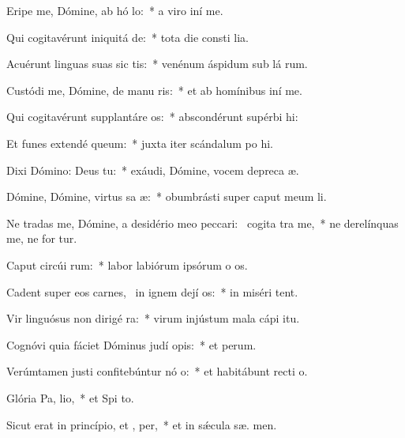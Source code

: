\item Eripe me, Dómine, ab hó lo:~* a viro iní  me.
\item Qui cogitavérunt iniquitá  de:~* tota die consti lia.
\item Acuérunt linguas suas sic tis:~* venénum áspidum sub lá rum.
\item Custódi me, Dómine, de manu ris:~* et ab homínibus iní  me.
\item Qui cogitavérunt supplantáre  os:~* abscondérunt supérbi  hi:
\item Et funes extendé  queum:~* juxta iter scándalum po hi.
\item Dixi Dómino: Deus   tu:~* exáudi, Dómine, vocem depreca æ.
\item Dómine, Dómine, virtus sa æ:~* obumbrásti super caput meum   li.
\item Ne tradas me, Dómine, a desidério meo peccari:~\pscross{} cogita tra me,~* ne derelínquas me, ne for tur.
\item Caput circúi rum:~* labor labiórum ipsórum o os.
\item Cadent super eos carnes,~\pscross{} in ignem dejí os:~* in miséri  tent.
\item Vir linguósus non dirigé  ra:~* virum injústum mala cápi  itu.
\item Cognóvi quia fáciet Dóminus judí opis:~* et  perum.
\item Verúmtamen justi confitebúntur nó o:~* et habitábunt recti   o.
\item Glória Pa,  lio,~* et Spi to.
\item Sicut erat in princípio, et ,  per,~* et in sǽcula sæ. men.

